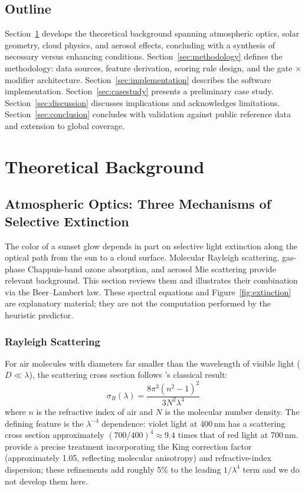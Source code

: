 \documentclass[11pt,a4paper]{article}
\begin{document}
\subsection{Outline}

Section~\ref{sec:theory} develops the theoretical background spanning atmospheric optics, solar geometry, cloud physics, and aerosol effects, concluding with a synthesis of necessary versus enhancing conditions. Section~\ref{sec:methodology} defines the methodology: data sources, feature derivation, scoring rule design, and the gate $\times$ modifier architecture. Section~\ref{sec:implementation} describes the software implementation. Section~\ref{sec:casestudy} presents a preliminary case study. Section~\ref{sec:discussion} discusses implications and acknowledges limitations. Section~\ref{sec:conclusion} concludes with validation against public reference data and extension to global coverage.

\section{Theoretical Background}
\label{sec:theory}

\subsection{Atmospheric Optics: Three Mechanisms of Selective Extinction}
\label{sec:atmoptics}

The color of a sunset glow depends in part on selective light extinction along the optical path from the sun to a cloud surface. Molecular Rayleigh scattering, gas-phase Chappuis-band ozone absorption, and aerosol Mie scattering provide relevant background. This section reviews them and illustrates their combination via the Beer--Lambert law. These spectral equations and Figure~\ref{fig:extinction} are explanatory material; they are not the computation performed by the heuristic predictor.

\subsubsection{Rayleigh Scattering}

For air molecules with diameters far smaller than the wavelength of visible light ($D \ll \lambda$), the scattering cross section follows \citet{strutt1871scattering}'s classical result:
\begin{equation}
\sigma_R(\lambda) = \frac{8 \pi^3 (n^2 - 1)^2}{3 N^2 \lambda^4}
\label{eq:rayleigh}
\end{equation}
where $n$ is the refractive index of air and $N$ is the molecular number density. The defining feature is the $\lambda^{-4}$ dependence: violet light at 400\,nm has a scattering cross section approximately $(700/400)^4 \approx 9.4$ times that of red light at 700\,nm. \citet{bodhaine1999rayleigh} provide a precise treatment incorporating the King correction factor (approximately 1.05, reflecting molecular anisotropy) and refractive-index dispersion; these refinements add roughly 5\% to the leading $1/\lambda^4$ term and we do not develop them here.
\end{document}
